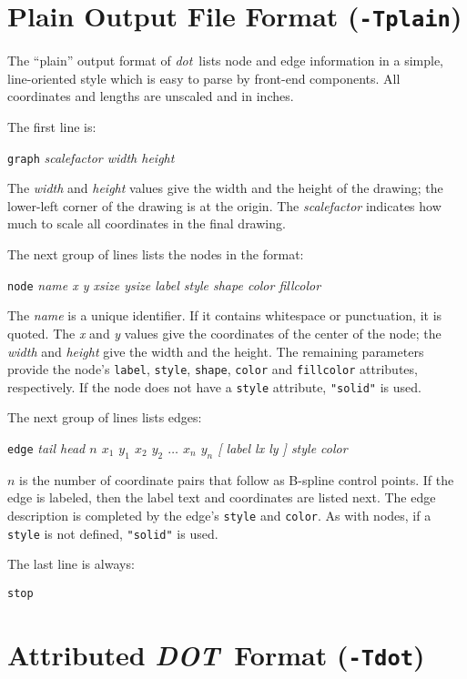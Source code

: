 \documentclass[11pt]{article}
\def\dot{{\it dot}}
\def\DOT{{\it DOT}}
\begin{document}
\section{Plain Output File Format ({\tt -Tplain})}
\label{app:plain}
{
\parindent0pt

The ``plain'' output format of \dot\ lists node and edge
information in a simple, line-oriented style which is easy
to parse by front-end components.
All coordinates and lengths are unscaled and in inches.

The first line is:

\hspace{.5in}\verb"graph" {\it scalefactor width height}

The {\it width} and {\it height} values give the width and the height
of the drawing; the lower-left corner of the drawing is at the origin.
The {\it scalefactor} indicates how much to scale all coordinates
in the final drawing.

The next group of lines lists the nodes in the format:

\hspace{.5in}\verb"node" {\it name x y xsize ysize label style shape color fillcolor }

The {\it name} is a unique identifier. If it contains whitespace or
punctuation, it is quoted. The {\it x} and {\it y} values give the coordinates
of the center of the node; the {\it width} and {\it height} give the 
width and the height. The remaining parameters provide the node's
{\tt label}, {\tt style}, {\tt shape}, {\tt color} and {\tt fillcolor} 
attributes, respectively. If the node does not have a {\tt style} attribute,
{\tt "solid"} is used. 

The next group of lines lists edges:

\hspace{.5in}\verb"edge" {\it tail head $n$ $x_1$ $y_1$ $x_2$ $y_2$
$\ldots$ $x_n$ $y_n$ {\rm [} label lx ly {\rm ]} style color }

$n$ is the number of coordinate pairs that follow as B-spline
control points.  If the edge is labeled, then the label text and
coordinates are listed next. The edge description is completed by 
the edge's {\tt style} and {\tt color}. As with nodes, if a {\tt style} is not
defined, {\tt "solid"} is used. 

The last line is always:

\hspace{.5in}\verb"stop"
}

\clearpage
\section{Attributed \DOT\ Format ({\tt -Tdot})}
\label{sect:output}
\end{document}
